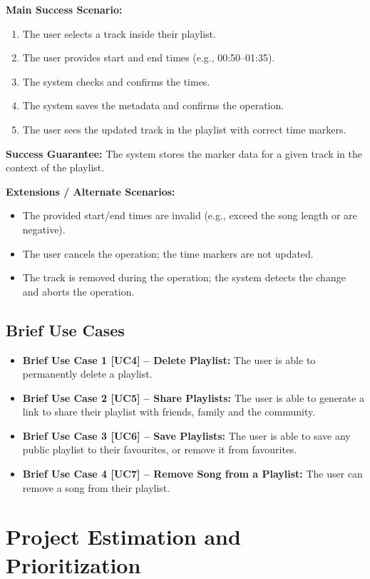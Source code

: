 \documentclass{article}
\begin{document}
\textbf{Main Success Scenario:}
\begin{enumerate}
  \item The user selects a track inside their playlist.
  \item The user provides start and end times (e.g., 00{:}50--01{:}35).
  \item The system checks and confirms the times.
  \item The system saves the metadata and confirms the operation.
  \item The user sees the updated track in the playlist with correct time markers.
\end{enumerate}

\textbf{Success Guarantee:}  
The system stores the marker data for a given track in the context of the playlist.

\textbf{Extensions / Alternate Scenarios:}
\begin{itemize}
  \item The provided start/end times are invalid (e.g., exceed the song length or are negative).
  \item The user cancels the operation; the time markers are not updated.
  \item The track is removed during the operation; the system detects the change and aborts the operation.
\end{itemize}

\subsection{Brief Use Cases}

\begin{itemize}
    \item \textbf{Brief Use Case 1 [UC4] -- Delete Playlist:} The user is able to permanently delete a playlist.
    \item \textbf{Brief Use Case 2 [UC5] -- Share Playlists:} The user is able to generate a link to share their playlist with friends, family and the community.
    \item \textbf{Brief Use Case 3 [UC6] -- Save Playlists:} The user is able to save any public playlist to their favourites, or remove it from favourites.
    \item \textbf{Brief Use Case 4 [UC7] -- Remove Song from a Playlist:} The user can remove a song from their playlist.
\end{itemize}

\section{Project Estimation and Prioritization}
\end{document}
